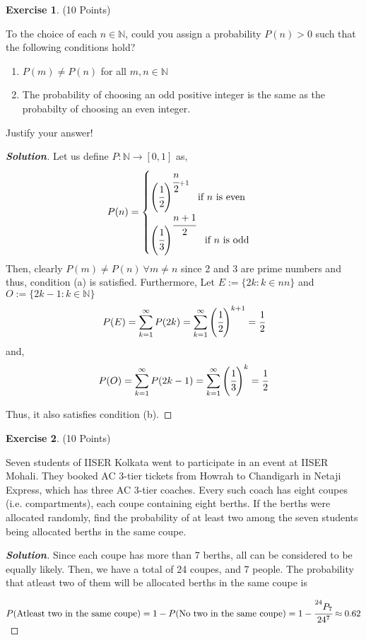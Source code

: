 \documentclass[10pt]{scrartcl}
\theoremstyle{definition}
\newtheorem{exercise}{Exercise}
\newenvironment{solution} {\begin{proof}[\normalfont \textbf{Solution}]} {\end{proof}}
\newcommand{\nn}{\mathbb{N}}
\begin{document}
\begin{exercise}(10 Points)

    To the choice of each $n \in \nn$, could you assign a probability $P(n) > 0$ such that the following conditions hold?
    \begin{enumerate}[label={(\alph*)}]
        \item $P(m) \neq P(n)$ for all $m, n \in \nn$
        \item The probability of choosing an odd positive integer is the same as the probabilty of choosing an even integer.
    \end{enumerate}
    Justify your answer!
\end{exercise}
\begin{solution}
    Let us define $P: \nn \to [0, 1]$ as,
    $$
    P(n) = 
    \begin{cases}
        \left(\cfrac{1}{2}\right)^{\cfrac{n}{2} + 1} ~ \text{ if } n \text{ is even} \\ 
        \left(\cfrac{1}{3}\right)^{\cfrac{n + 1}{2}} ~ \text{ if } n \text{ is odd}
    \end{cases}
    $$
    Then, clearly $P(m) \neq P(n) ~ \forall m \neq n$ since 2 and 3 are prime numbers and thus, condition (a) is satisfied.
    Furthermore, Let $E := \{2k : k \in nn\}$ and $O := \{2k - 1 : k \in \nn \}$
    $$P(E) = \sum_{k = 1}^{\infty} P(2k) = \sum_{k = 1}^{\infty} \left(\cfrac{1}{2}\right)^{k + 1} = \cfrac{1}{2}$$
    and, 
    $$P(O) = \sum_{k = 1}^{\infty} P(2k - 1) = \sum_{k = 1}^{\infty} \left(\cfrac{1}{3}\right)^{k} = \cfrac{1}{2}$$

    Thus, it also satisfies condition (b).
\end{solution}
\begin{exercise}(10 Points)

    Seven students of IISER Kolkata went to participate in an event at IISER Mohali. They booked
    AC 3-tier tickets from Howrah to Chandigarh in Netaji Express, which has three AC 3-tier
    coaches. Every such coach has eight coupes (i.e. compartments), each coupe containing eight
    berths. If the berths were allocated randomly, find the probability of at least two among the
    seven students being allocated berths in the same coupe.
\end{exercise}
\begin{solution}
    Since each coupe has more than 7 berths, all can be considered to be equally likely. Then, we have a total of 24 coupes, and 
    7 people. The probability that atleast two of them will be allocated berths in the same coupe is 

$P(\text{Atleast two in the same coupe}) = 1 - P(\text{No two in the same coupe}) = 1 - \cfrac{^{24}P_7}{24^7} \approx 0.62$
\end{solution}
\end{document}
